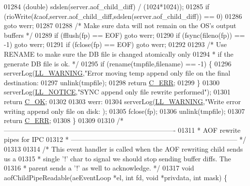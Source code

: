 \begin{DoxyCode}
{{{{{{{{{{{{{{{{{{{01284         (\textcolor{keywordtype}{double}) sdslen(server.aof\_child\_diff) / (1024*1024));
01285     \textcolor{keywordflow}{if} (rioWrite(&aof,server.aof\_child\_diff,sdslen(server.aof\_child\_diff)) == 0)
01286         \textcolor{keywordflow}{goto} werr;
01287 
01288     \textcolor{comment}{/* Make sure data will not remain on the OS's output buffers */}
01289     \textcolor{keywordflow}{if} (fflush(fp) == EOF) \textcolor{keywordflow}{goto} werr;
01290     \textcolor{keywordflow}{if} (fsync(fileno(fp)) == -1) \textcolor{keywordflow}{goto} werr;
01291     \textcolor{keywordflow}{if} (fclose(fp) == EOF) \textcolor{keywordflow}{goto} werr;
01292 
01293     \textcolor{comment}{/* Use RENAME to make sure the DB file is changed atomically only}
01294 \textcolor{comment}{     * if the generate DB file is ok. */}
01295     \textcolor{keywordflow}{if} (rename(tmpfile,filename) == -1) \{
01296         serverLog(\hyperlink{server_8h_a31229b9334bba7d6be2a72970967a14b}{LL\_WARNING},\textcolor{stringliteral}{"Error moving temp append only file on the final destination:
01297         unlink(tmpfile);
01298         \textcolor{keywordflow}{return} \hyperlink{server_8h_af98ac28d5f4d23d7ed5985188e6fb7d1}{C\_ERR};
01299     \}
01300     serverLog(\hyperlink{server_8h_a8c54c191e436c7dd3012167212692401}{LL\_NOTICE},\textcolor{stringliteral}{"SYNC append only file rewrite performed"});
01301     \textcolor{keywordflow}{return} \hyperlink{server_8h_a303769ef1065076e68731584e758d3e1}{C\_OK};
01302 
01303 werr:
01304     serverLog(\hyperlink{server_8h_a31229b9334bba7d6be2a72970967a14b}{LL\_WARNING},\textcolor{stringliteral}{"Write error writing append only file on disk: %
      );
01305     fclose(fp);
01306     unlink(tmpfile);
01307     \textcolor{keywordflow}{return} \hyperlink{server_8h_af98ac28d5f4d23d7ed5985188e6fb7d1}{C\_ERR};
01308 \}
01309 
01310 \textcolor{comment}{/* ----------------------------------------------------------------------------}
01311 \textcolor{comment}{ * AOF rewrite pipes for IPC}
01312 \textcolor{comment}{ * -------------------------------------------------------------------------- */}
01313 
01314 \textcolor{comment}{/* This event handler is called when the AOF rewriting child sends us a}
01315 \textcolor{comment}{ * single '!' char to signal we should stop sending buffer diffs. The}
01316 \textcolor{comment}{ * parent sends a '!' as well to acknowledge. */}
01317 \textcolor{keywordtype}{void} aofChildPipeReadable(aeEventLoop *el, \textcolor{keywordtype}{int} fd, \textcolor{keywordtype}{void} *privdata, \textcolor{keywordtype}{int} mask) \{
}}}}}}}}}}}}}}}}}}}}}
\end{DoxyCode}
